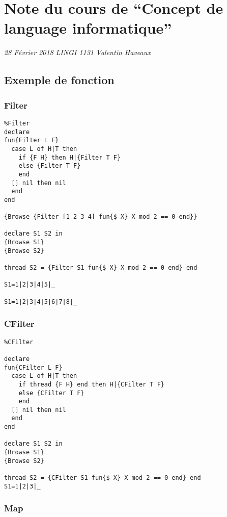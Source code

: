 \documentclass[]{article}
\date{}
\begin{document}
\hypertarget{note-du-cours-de-concept-de-language-informatique}{%
\section{Note du cours de ``Concept de language
informatique''}\label{note-du-cours-de-concept-de-language-informatique}}

\emph{28 Février 2018} \emph{LINGI 1131} \emph{Valentin Haveaux}

\hypertarget{exemple-de-fonction}{%
\subsection{Exemple de fonction}\label{exemple-de-fonction}}

\hypertarget{filter}{%
\subsubsection{Filter}\label{filter}}

\begin{verbatim}
%Filter
declare
fun{Filter L F}
  case L of H|T then
    if {F H} then H|{Filter T F}  
    else {Filter T F}
    end
  [] nil then nil
  end
end

{Browse {Filter [1 2 3 4] fun{$ X} X mod 2 == 0 end}}

declare S1 S2 in
{Browse S1}
{Browse S2}

thread S2 = {Filter S1 fun{$ X} X mod 2 == 0 end} end

S1=1|2|3|4|5|_

S1=1|2|3|4|5|6|7|8|_
\end{verbatim}

\hypertarget{cfilter}{%
\subsubsection{CFilter}\label{cfilter}}

\begin{verbatim}
%CFilter

declare
fun{CFilter L F}
  case L of H|T then
    if thread {F H} end then H|{CFilter T F}  
    else {CFilter T F}
    end
  [] nil then nil
  end
end

declare S1 S2 in
{Browse S1}
{Browse S2}

thread S2 = {CFilter S1 fun{$ X} X mod 2 == 0 end} end
S1=1|2|3|_
\end{verbatim}

\hypertarget{map}{%
\subsubsection{Map}\label{map}}
\end{document}
